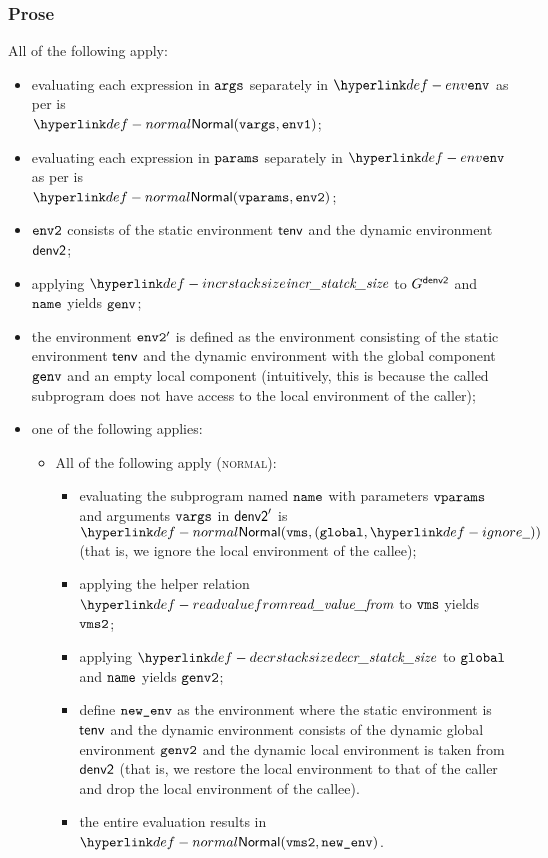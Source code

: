 \subsubsection{Prose}
All of the following apply:
\begin{itemize}
  \item evaluating each expression in $\texttt{args}$ separately in $\env$ as per 
  is \\ $\Normal(\vvargs, \envone)$\ProseOrAbnormal;
  \item evaluating each expression in $\texttt{params}$ separately in $\env$ as per 
  is \\ $\Normal(\vvparams, \envtwo)$\ProseOrAbnormal;
  \item $\texttt{env2}$ consists of the static environment $\textsf{tenv}$ and the dynamic environment $\textsf{denv2}$;
  \item applying $\incrstacksize$ to $G^{\textsf{denv2}}$ and $\texttt{name}$ yields $\texttt{genv}$;
  \item the environment $\texttt{env2}'$ is defined as the environment
  consisting of the static environment $\textsf{tenv}$ and the dynamic environment with the global component
  $\texttt{genv}$ and an empty local component (intuitively, this is because the called subprogram does not have access
  to the local environment of the caller);
  \item one of the following applies:
  \begin{itemize}
    \item All of the following apply (\textsc{normal}):
    \begin{itemize}
      \item evaluating the subprogram named $\texttt{name}$ with parameters $\texttt{vparams}$ and arguments $\texttt{vargs}$ in
      $\textsf{denv2}'$ is $\Normal(\vms, (\vglobal, \Ignore))$ (that is, we ignore the local environment
      of the callee)\ProseOrError;
      \item applying the helper relation $\readvaluefrom$ to $\texttt{vms}$ yields $\texttt{vms2}$;
      \item applying $\decrstacksize$ to $\texttt{global}$ and $\texttt{name}$ yields $\texttt{genv2}$;
      \item define $\texttt{new\_env}$ as the environment where the static environment is $\textsf{tenv}$ and the dynamic environment consists
            of the dynamic global environment $\texttt{genv2}$ and the dynamic local environment is taken from $\textsf{denv2}$
            (that is, we restore the local environment to that of the caller and drop the local environment of the callee).
      \item the entire evaluation results in $\Normal(\vmstwo, \newenv)$.
    \end{itemize}


\end{itemize}
\end{itemize}
